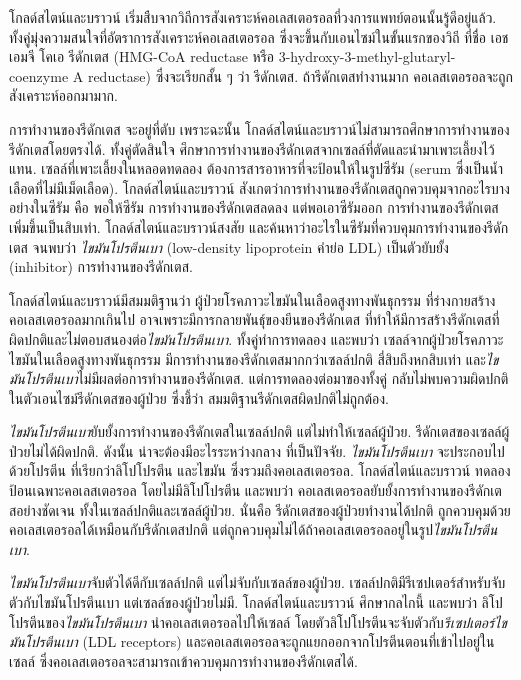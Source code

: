 {\begin{shaded}
โกลด์สไตน์และบราวน์ เริ่มสืบจากวิถีการสังเคราะห์คอเลสเตอรอลที่วงการแพทย์ตอนนั้นรู้ดีอยู่แล้ว.
ทั้งคู่มุ่งความสนใจที่อัตราการสังเคราะห์คอเลสเตอรอล ซึ่งจะขึ้นกับเอนไซม์ในขั้นแรกของวิถี ที่ชื่อ
เอชเอมจี โคเอ รีดักเตส (HMG-CoA reductase หรือ 3-hydroxy-3-methyl-glutaryl-coenzyme A reductase)
ซึ่งจะเรียกสั้น ๆ ว่า รีดักเตส.
ถ้ารีดักเตสทำงานมาก คอเลสเตอรอลจะถูกสังเคราะห์ออกมามาก.

การทำงานของรีดักเตส จะอยู่ที่ตับ
เพราะฉะนั้น โกลด์สไตน์และบราวน์ไม่สามารถศึกษาการทำงานของรีดักเตสโดยตรงได้.
ทั้งคู่ตัดสินใจ ศึกษาการทำงานของรีดักเตสจากเซลล์ที่ตัดและนำมาเพาะเลี้ยงไว้แทน.
เซลล์ที่เพาะเลี้ยงในหลอดทดลอง ต้องการสารอาหารที่จะป้อนให้ในรูปซีรัม (serum ซึ่งเป็นน้ำเลือดที่ไม่มีเม็ดเลือด).
โกลด์สไตน์และบราวน์ สังเกตว่าการทำงานของรีดักเตสถูกควบคุมจากอะไรบางอย่างในซีรัม 
คือ พอให้ซีรัม การทำงานของรีดักเตสลดลง
แต่พอเอาซีรัมออก การทำงานของรีดักเตสเพิ่มขึ้นเป็นสิบเท่า.
โกลด์สไตน์และบราวน์สงสัย และค้นหาว่าอะไรในซีรัมที่ควบคุมการทำงานของรีดักเตส
จนพบว่า \textit{ไขมันโปรตีนเบา} (low-density lipoprotein คำย่อ LDL)
เป็นตัวยับยั้ง (inhibitor) การทำงานของรีดักเตส.

โกลด์สไตน์และบราวน์มีสมมติฐานว่า ผู้ป่วยโรคภาวะไขมันในเลือดสูงทางพันธุกรรม
ที่ร่างกายสร้างคอเลสเตอรอลมากเกินไป
อาจเพราะมีการกลายพันธุ์ของยีนของ{รีดักเตส} ที่ทำให้มีการสร้างรีดักเตสที่ผิดปกติและไม่ตอบสนองต่อ\textit{ไขมันโปรตีนเบา}.
ทั้งคู่ทำการทดลอง และพบว่า 
เซลล์จากผู้ป่วยโรคภาวะไขมันในเลือดสูงทางพันธุกรรม
มีการทำงานของรีดักเตสมากกว่าเซลล์ปกติ สี่สิบถึงหกสิบเท่า
และ\textit{ไขมันโปรตีนเบา}ไม่มีผลต่อการทำงานของรีดักเตส.
แต่การทดลองต่อมาของทั้งคู่ กลับไม่พบความผิดปกติในตัวเอนไซม์รีดักเตสของผู้ป่วย ซึ่งชี้ว่า สมมติฐานรีดักเตสผิดปกติไม่ถูกต้อง.

\textit{ไขมันโปรตีนเบา}ยับยั้งการทำงานของรีดักเตสในเซลล์ปกติ แต่ไม่ทำให้เซลล์ผู้ป่วย.
รีดักเตสของเซลล์ผู้ป่วยไม่ได้ผิดปกติ.
ดังนั้น น่าจะต้องมีอะไรระหว่างกลาง ที่เป็นปัจจัย.
\textit{ไขมันโปรตีนเบา} จะประกอบไปด้วยโปรตีน ที่เรียกว่าลิโปโปรตีน และไขมัน ซึ่งรวมถึงคอเลสเตอรอล.
โกลด์สไตน์และบราวน์ 
ทดลองป้อนเฉพาะคอเลสเตอรอล โดยไม่มีลิโปโปรตีน
และพบว่า คอเลสเตอรอลยับยั้งการทำงานของรีดักเตสอย่างชัดเจน ทั้งในเซลล์ปกติและเซลล์ผู้ป่วย.
นั่นคือ 
รีดักเตสของผู้ป่วยทำงานได้ปกติ ถูกควบคุมด้วยคอเลสเตอรอลได้เหมือนกับรีดักเตสปกติ
แต่ถูกควบคุมไม่ได้ถ้าคอเลสเตอรอลอยู่ในรูป\textit{ไขมันโปรตีนเบา}.

\textit{ไขมันโปรตีนเบา}จับตัวได้ดีกับเซลล์ปกติ แต่ไม่จับกับเซลล์ของผู้ป่วย.
เซลล์ปกติมีรีเซปเตอร์สำหรับจับตัวกับไขมันโปรตีนเบา
แต่เซลล์ของผู้ป่วยไม่มี.
โกลด์สไตน์และบราวน์
ศึกษากลไกนี้ และพบว่า
ลิโปโปรตีนของ\textit{ไขมันโปรตีนเบา} นำคอเลสเตอรอลไปให้เซลล์
โดยตัวลิโปโปรตีนจะจับตัวกับ\textit{รีเซปเตอร์ไขมันโปรตีนเบา} (LDL receptors)
และคอเลสเตอรอลจะถูกแยกออกจากโปรตีนตอนที่เข้าไปอยู่ในเซลล์ 
ซึ่งคอเลสเตอรอลจะสามารถเข้าควบคุมการทำงานของรีดักเตสได้.


\end{shaded}}

